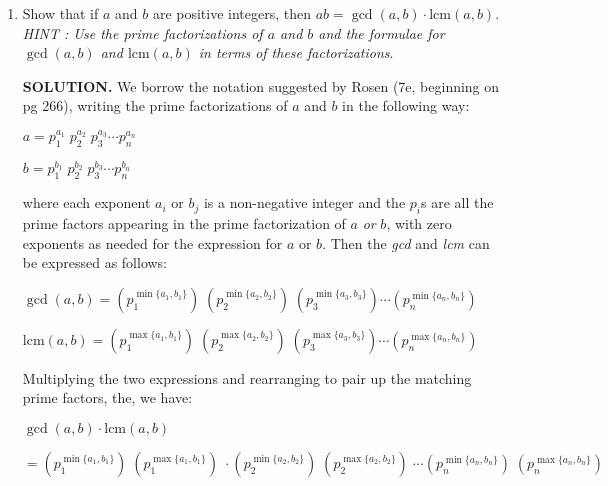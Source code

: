 \documentclass{article}
\begin{document}
\begin{enumerate}


\item Show that if $a$ and $b$ are positive integers, then $ab = \gcd(a,b)\cdot \text{lcm}(a,b)$. \textit{HINT : Use the prime factorizations of $a$ and $b$ and the formulae for $\gcd(a, b)$ and $\text{lcm} (a, b)$ in terms of these factorizations}.\par

\vspace{0.1 in}

\textbf{SOLUTION.} We borrow the notation suggested by Rosen (7e, beginning on pg 266), writing the prime factorizations of $a$ and $b$ in the following way:\par

\begin{adjustwidth}{0.5 in}{0.5 in}
$a = p_1^{a_1}\; p_2^{a_2}\; p_3^{a_3}\cdots p_n^{a_n}$\par
$b = p_1^{b_1}\; p_2^{b_2}\; p_3^{b_3}\cdots p_n^{b_n}$\par
\end{adjustwidth}

where each exponent $a_i$ or $b_j$ is a non-negative integer and the $p_i$s are all the prime factors appearing in the prime factorization of $a$ \textit{or} $b$, with zero exponents as needed for the expression for $a$ or $b$. Then the \textit{gcd} and \textit{lcm} can be expressed as follows:\par
\begin{adjustwidth}{0.5 in}{0.5 in}
$\gcd(a, b) = (p_1^{\min\{a_1, b_1\}})\;
              (p_2^{\min\{a_2, b_2\}})\;
              (p_3^{\min\{a_3, b_3\}}) \cdots
              (p_n^{\min\{a_n, b_n\}})$\par
lcm$(a,b)   = (p_1^{\max\{a_1, b_1\}})\;
              (p_2^{\max\{a_2, b_2\}})\;
              (p_3^{\max\{a_3, b_3\}}) \cdots
              (p_n^{\max\{a_n, b_n\}})$\par
\end{adjustwidth}
Multiplying the two expressions and rearranging to pair up the matching prime factors, the, we have:\par
\begin{adjustwidth}{0.5 in}{0.5 in}
$\gcd(a, b)\cdot\text{lcm}(a,b)$\par
  $= (p_1^{\min\{a_1, b_1\}})\;
     (p_1^{\max\{a_1, b_1\}})\;\cdot
     (p_2^{\min\{a_2, b_2\}})\;
     (p_2^{\max\{a_2, b_2\}})\;\cdots
     (p_n^{\min\{a_n, b_n\}})\;
     (p_n^{\max\{a_n, b_n\}})$\par
     

\end{adjustwidth}
\end{enumerate}
\end{document}
